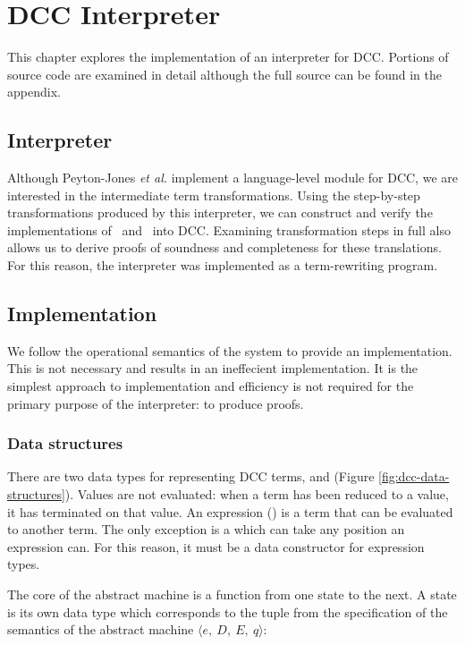 \chapter{DCC Interpreter}

This chapter explores the implementation of an interpreter for DCC. Portions of source code are examined in detail although the full source can be found in the appendix.

\section{Interpreter}

Although Peyton-Jones \emph{et al.} implement a language-level module for DCC, 
we are interested in the intermediate term transformations.
Using the step-by-step transformations produced by this interpreter,
we can construct and verify the implementations of \ltry\ and \lmu\ into DCC.
Examining transformation steps in full also allows us to derive proofs of soundness and completeness for these translations. 
For this reason, the interpreter was implemented as a term-rewriting program.

\section{Implementation}
We follow the operational semantics of the system to provide an implementation.
This is not necessary and results in an ineffecient implementation.
It is the simplest approach to implementation and efficiency is not required for the primary purpose of the interpreter: to produce proofs.

\subsection{Data structures}
There are two data types for representing DCC terms,  and 
(Figure \ref{fig:dcc-data-structures}).
Values are not evaluated: when a term has been reduced to a value, 
it has terminated on that value. 
An expression () is a term that can be evaluated to another term. 
The only exception is a  which can take any position an expression can. 
For this reason, it must be a data constructor for expression types.

The core of the abstract machine is a function from one state to the next. 
A state is its own data type which corresponds to the tuple from the specification of the semantics of the abstract machine $\langle e,\ D,\ E,\ q\rangle$:

